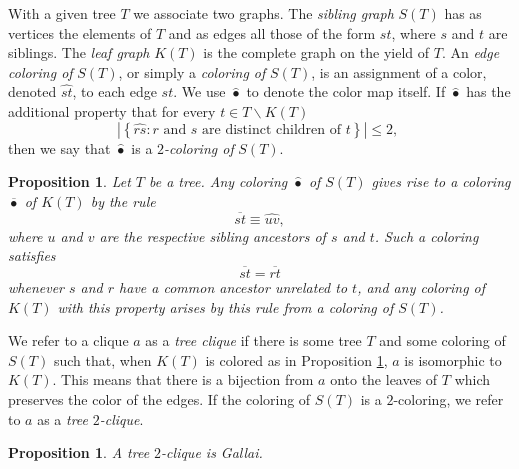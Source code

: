 \documentclass[12pt]{amsart}
\theoremstyle{plain}
\newtheorem{proposition}[theorem]{Proposition}
\numberwithin{equation}{section}
\begin{document}
With a given tree $T$ we associate two graphs. The \emph{sibling graph
}$S\left(  T\right)  $ has as vertices the elements of $T$ and as edges all
those of the form $st$, where $s$ and $t$ are siblings. The \emph{leaf graph
}$K\left(  T\right)  $ is the complete graph on the yield of $T$. An
\emph{edge coloring of }$S\left(  T\right)  $, or simply a \emph{coloring of
}$S\left(  T\right)  $, is an assignment of a color, denoted $\widehat{st}$,
to each edge $st$. We use $\widehat{\bullet}$ to denote the color map itself.
If $\widehat{\bullet}$ has the additional property that for every $t\in
T\smallsetminus K\left(  T\right)  $
\begin{displaymath}
    \left\vert \left\{  \widehat{rs}:r\text{ and }s\text{ are distinct children of
    }t\right\}  \right\vert \leq2,\;
\end{displaymath}
then we say that $\widehat{\bullet}$ is a $2$\emph{-coloring of }$S\left(
T\right)  $.

\begin{proposition}
\label{5}Let $T$ be a tree. Any coloring $\widehat{\bullet}$ of $S\left(
T\right)  $ gives rise to a coloring $\overline{\bullet}$ of $K\left( T\right)$
by the rule
\begin{displaymath}
    \overline{st}\equiv\widehat{uv},
\end{displaymath}
where $u$ and $v$ are the respective sibling ancestors of $s$ and $t$. Such a
coloring satisfies
\begin{displaymath}
    \overline{st}=\overline{rt}
\end{displaymath}
whenever $s$ and $r$ have a common ancestor unrelated to $t$, and any coloring
of $K\left(  T\right)  $ with this property arises by this rule from a
coloring of $S\left(  T\right)  $.
\end{proposition}

We refer to a clique $a$ as a \emph{tree clique} if there is some tree $T$ and
some coloring of $S\left(  T\right)  $ such that, when $K\left(  T\right)  $
is colored as in Proposition \ref{5}, $a$ is isomorphic to $K\left(  T\right)
$. This means that there is a bijection from $a$ onto the leaves of $T$ which
preserves the color of the edges. If the coloring of $S\left(  T\right)  $ is
a $2$-coloring, we refer to $a$ as a \emph{tree }$2$\emph{-clique}.

\begin{proposition}
\label{2}A tree $2$-clique is Gallai.
\end{proposition}
\end{document}
